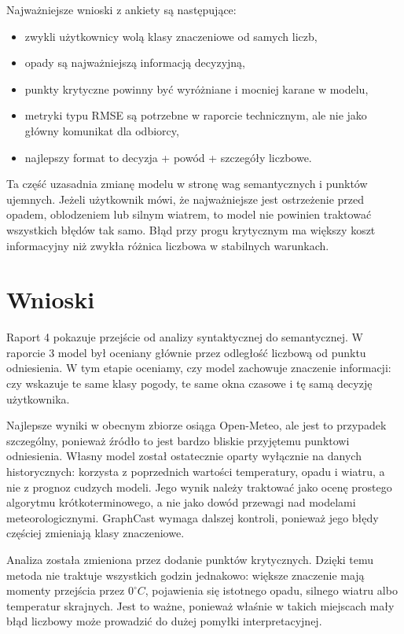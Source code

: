 \documentclass[a4paper,12pt]{article}
\begin{document}
Najważniejsze wnioski z ankiety są następujące:
\begin{itemize}
    \item zwykli użytkownicy wolą klasy znaczeniowe od samych liczb,
    \item opady są najważniejszą informacją decyzyjną,
    \item punkty krytyczne powinny być wyróżniane i mocniej karane w modelu,
    \item metryki typu RMSE są potrzebne w raporcie technicznym, ale nie jako główny komunikat dla odbiorcy,
    \item najlepszy format to decyzja + powód + szczegóły liczbowe.
\end{itemize}

Ta część uzasadnia zmianę modelu w stronę wag semantycznych i punktów ujemnych.
Jeżeli użytkownik mówi, że najważniejsze jest ostrzeżenie przed opadem,
oblodzeniem lub silnym wiatrem, to model nie powinien traktować wszystkich
błędów tak samo. Błąd przy progu krytycznym ma większy koszt informacyjny niż
zwykła różnica liczbowa w stabilnych warunkach.
\newpage
\section{Wnioski}

Raport 4 pokazuje przejście od analizy syntaktycznej do semantycznej. W
raporcie 3 model był oceniany głównie przez odległość liczbową od punktu
odniesienia. W tym etapie oceniamy, czy model zachowuje znaczenie informacji:
czy wskazuje te same klasy pogody, te same okna czasowe i tę samą decyzję
użytkownika.

Najlepsze wyniki w obecnym zbiorze osiąga Open-Meteo, ale jest to przypadek
szczególny, ponieważ źródło to jest bardzo bliskie przyjętemu punktowi
odniesienia. Własny model został ostatecznie oparty wyłącznie na danych
historycznych: korzysta z poprzednich wartości temperatury, opadu i wiatru, a
nie z prognoz cudzych modeli. Jego wynik należy traktować jako ocenę prostego
algorytmu krótkoterminowego, a nie jako dowód przewagi nad modelami
meteorologicznymi. GraphCast wymaga dalszej kontroli, ponieważ jego błędy
częściej zmieniają klasy znaczeniowe.

Analiza została zmieniona przez dodanie punktów krytycznych. Dzięki temu
metoda nie traktuje wszystkich godzin jednakowo: większe znaczenie mają
momenty przejścia przez \(0^\circ C\), pojawienia się istotnego opadu,
silnego wiatru albo temperatur skrajnych. Jest to ważne, ponieważ właśnie w
takich miejscach mały błąd liczbowy może prowadzić do dużej pomyłki
interpretacyjnej.
\end{document}
